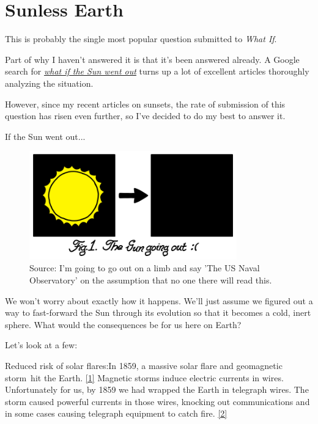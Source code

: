 {{
\chapter{Sunless Earth}
}

\hfill{}

{This is probably the single most popular question submitted to \emph{What If}.}

{Part of why I haven’t answered it is that it's been answered already. A Google search for \emph{ \href{http://www.google.com/search?q=what+if+the+Sun+went+out}{what if the Sun went out}} turns up a lot of excellent articles thoroughly analyzing the situation.}

{However, since my recent articles on sunsets, the rate of submission of this question has risen even further, so I’ve decided to do my best to answer it.}

{If the Sun went out...}

\begin{figure}[!htbp]
\centering
\includegraphics[scale=0.5, max width=0.8\textwidth]{imgs/a/49/sunless_diagram.png}
\caption{Source: I'm going to go out on a limb and say 'The US Naval Observatory' on the assumption that no one there will read this.}
\end{figure}

{We won’t worry about exactly how it happens. We'll just assume we figured out a way to fast-forward the Sun through its evolution so that it becomes a cold, inert sphere. What would the consequences be for us here on Earth?}

{Let's look at a few:}

{Reduced risk of solar flares:In 1859, a massive solar flare and geomagnetic storm hit the Earth. \href{http://www.leif.org/research/1859\%20Storm\%20-\%20Extreme\%20Space\%20Weather.pdf}{[1]} Magnetic storms induce electric currents in wires. Unfortunately for us, by 1859 we had wrapped the Earth in telegraph wires. The storm caused powerful currents in those wires, knocking out communications and in some cases causing telegraph equipment to catch fire. \href{http://trs-new.jpl.nasa.gov/dspace/bitstream/2014/8787/1/02-1310.pdf} {[2]}}

}
